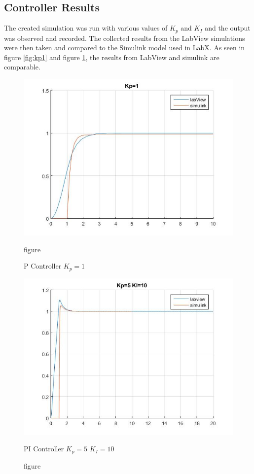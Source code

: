 \documentclass[11pt,titlepage]{article}
\begin{document}
	\subsection{Controller Results}
		The created simulation was run with various values of $K_p$ and $K_I$ and the output was observed and recorded. The collected results from the LabView simulations were then taken and compared to the Simulink model used in LabX. As seen in figure \ref{fig:kp1} and figure \ref{fig:kp5KI10}, the results from LabView and simulink are comparable.
		\begin{figure}[h!]
			\centering
			\begin{minipage}{.5\textwidth}
				\centering
				\includegraphics[scale=.4]{Kp1}
				\caption{figure}{P Controller $K_p=1$}
				\label{fig:kp1}
			\end{minipage}%
			\begin{minipage}{.5\textwidth}
				\centering
				\includegraphics[scale=.4]{Kp5KI10}
				\caption{figure}{PI Controller $K_p=5$ $K_I=10$}
				\label{fig:kp5KI10}
			\end{minipage}%
		\end{figure}	
\end{document}
